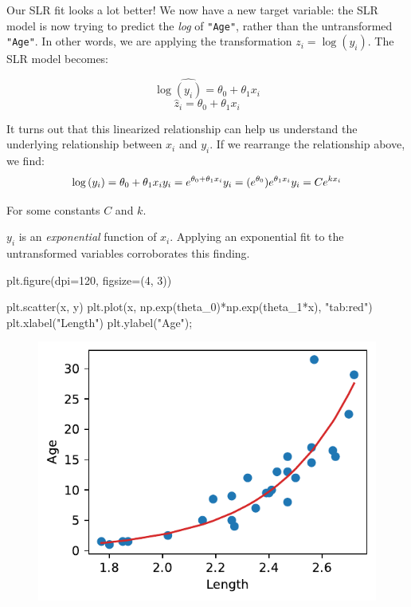 \documentclass[
  letterpaper,
  DIV=11,
  numbers=noendperiod]{scrreprt}
\newenvironment{Shaded}{\begin{snugshade}}{\end{snugshade}}
\newcommand{\DecValTok}[1]{\textcolor[rgb]{0.68,0.00,0.00}{#1}}
\newcommand{\NormalTok}[1]{\textcolor[rgb]{0.00,0.23,0.31}{#1}}
\newcommand{\OperatorTok}[1]{\textcolor[rgb]{0.37,0.37,0.37}{#1}}
\newcommand{\StringTok}[1]{\textcolor[rgb]{0.13,0.47,0.30}{#1}}
\begin{document}
Our SLR fit looks a lot better! We now have a new target variable: the
SLR model is now trying to predict the \emph{log} of \texttt{"Age"},
rather than the untransformed \texttt{"Age"}. In other words, we are
applying the transformation \(z_i = \log{(y_i)}\). The SLR model
becomes:

\[\log{\hat{(y_i)}} = \theta_0 + \theta_1 x_i\]
\[\hat{z}_i = \theta_0 + \theta_1 x_i\]

It turns out that this linearized relationship can help us understand
the underlying relationship between \(x_i\) and \(y_i\). If we rearrange
the relationship above, we find: \[
\log{(y_i)} = \theta_0 + \theta_1 x_i \\
y_i = e^{\theta_0 + \theta_1 x_i} \\
y_i = (e^{\theta_0})e^{\theta_1 x_i} \\
y_i = C e^{k x_i}
\]

For some constants \(C\) and \(k\).

\(y_i\) is an \emph{exponential} function of \(x_i\). Applying an
exponential fit to the untransformed variables corroborates this
finding.

\begin{Shaded}
\begin{Highlighting}[]
\NormalTok{plt.figure(dpi}\OperatorTok{=}\DecValTok{120}\NormalTok{, figsize}\OperatorTok{=}\NormalTok{(}\DecValTok{4}\NormalTok{, }\DecValTok{3}\NormalTok{))}

\NormalTok{plt.scatter(x, y)}
\NormalTok{plt.plot(x, np.exp(theta\_0)}\OperatorTok{*}\NormalTok{np.exp(theta\_1}\OperatorTok{*}\NormalTok{x), }\StringTok{"tab:red"}\NormalTok{)}
\NormalTok{plt.xlabel(}\StringTok{"Length"}\NormalTok{)}
\NormalTok{plt.ylabel(}\StringTok{"Age"}\NormalTok{)}\OperatorTok{;}
\end{Highlighting}
\end{Shaded}

\begin{figure}[H]

{\centering \includegraphics{constant_model_loss_transformations/loss_transformations_files/figure-pdf/cell-8-output-1.pdf}

}

\end{figure}
\end{document}
